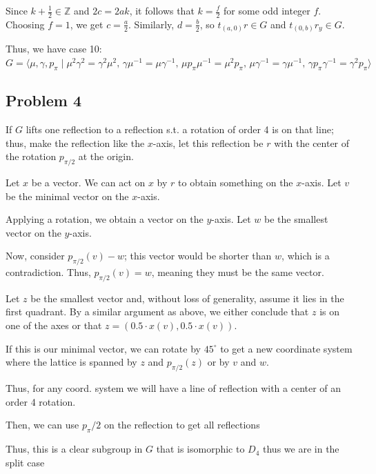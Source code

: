 \documentclass[12pt, letterpaper]{article}
\theoremstyle{definition}
\begin{document}
Since \( k + \frac{1}{2} \in \mathbb{Z} \) and \( 2c = 2ak \), it follows that \( k = \frac{f}{2} \) for some odd integer \( f \). Choosing \( f = 1 \), we get \( c = \frac{a}{2} \). Similarly, \( d = \frac{b}{2} \), so \( t_{(a,0)} r \in G \) and \( t_{(0,b)} r_y \in G \).

Thus, we have case 10:
\phantom{text}\\
$G = \langle \mu, \gamma, p_\pi \mid \mu^2 \gamma^2 = \gamma^2 \mu^2, \, \gamma \mu^{-1} = \mu \gamma^{-1}, \, \mu p_\pi \mu^{-1} = \mu^2 p_\pi, \, \mu \gamma^{-1} = \gamma \mu^{-1}, \, \gamma p_\pi \gamma^{-1} = \gamma^2 p_\pi \rangle$
\phantom{text}\\

\newpage
\subsection*{Problem 4}
\hspace{0.48cm} If \( G \) lifts one reflection to a reflection s.t. a rotation of order 4 is on that line; thus, make the reflection like the $x$-axis, let this reflection be \( r \) with the center of the rotation \( p_{\pi/2} \) at the origin.

Let \( x \) be a vector. We can act on \( x \) by \( r \) to obtain something on the \( x \)-axis. Let \( v \) be the minimal vector on the \( x \)-axis.

Applying a rotation, we obtain a vector on the \( y \)-axis. Let \( w \) be the smallest vector on the \( y \)-axis.

Now, consider \( p_{\pi/2}(v) - w \); this vector would be shorter than \( w \), which is a contradiction. Thus, \( p_{\pi/2}(v) = w \), meaning they must be the same vector.

Let \( z \) be the smallest vector and, without loss of generality, assume it lies in the first quadrant. By a similar argument as above, we either conclude that \( z \) is on one of the axes or that \( z = \left(0.5 \cdot x(v), 0.5 \cdot x(v)\right) \).

If this is our minimal vector, we can rotate by \( 45^\circ \) to get a new coordinate system where the lattice is spanned by \( z \) and \( p_{\pi/2}(z) \) or by \( v \) and \( w \).

Thus, for any coord. system we will have a line of reflection with a center of an order 4 rotation.

Then, we can use $p_\pi/2$ on the reflection to get all reflections

Thus, this is a clear subgroup in $G$ that is isomorphic to $D_4$ thus we are in the split case
\end{document}
